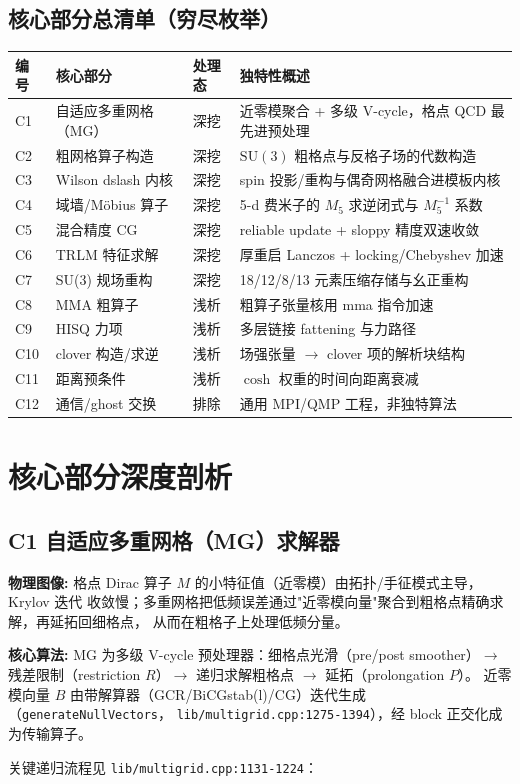 \documentclass[UTF8]{ctexart}
\begin{document}
\subsection{核心部分总清单（穷尽枚举）}
\begin{xltabular}{\textwidth}{lllX}
\toprule
\textcolor{algo}{编号} & 核心部分 & 处理态 & 独特性概述 \\
\midrule
\endhead
C1 & 自适应多重网格（MG） & 深挖 & 近零模聚合 + 多级 V-cycle，格点 QCD 最先进预处理 \\
C2 & 粗网格算子构造 & 深挖 & $\mathrm{SU}(3)$ 粗格点与反格子场的代数构造 \\
C3 & Wilson dslash 内核 & 深挖 & spin 投影/重构与偶奇网格融合进模板内核 \\
C4 & 域墙/Möbius 算子 & 深挖 & 5-d 费米子的 $M_5$ 求逆闭式与 $M_5^{-1}$ 系数 \\
C5 & 混合精度 CG & 深挖 & reliable update + sloppy 精度双速收敛 \\
C6 & TRLM 特征求解 & 深挖 & 厚重启 Lanczos + locking/Chebyshev 加速 \\
C7 & SU(3) 规场重构 & 深挖 & 18/12/8/13 元素压缩存储与幺正重构 \\
C8 & MMA 粗算子 & 浅析 & 粗算子张量核用 mma 指令加速 \\
C9 & HISQ 力项 & 浅析 & 多层链接 fattening 与力路径 \\
C10 & clover 构造/求逆 & 浅析 & 场强张量 $\to$ clover 项的解析块结构 \\
C11 & 距离预条件 & 浅析 & $\cosh$ 权重的时间向距离衰减 \\
C12 & 通信/ghost 交换 & 排除 & 通用 MPI/QMP 工程，非独特算法 \\
\bottomrule
\end{xltabular}

\section{核心部分深度剖析}

\subsection{C1 自适应多重网格（MG）求解器}
\begin{physbox}
\textbf{物理图像:} 格点 Dirac 算子 $M$ 的小特征值（近零模）由拓扑/手征模式主导，Krylov 迭代
收敛慢；多重网格把低频误差通过"近零模向量"聚合到粗格点精确求解，再延拓回细格点，
从而在粗格子上处理低频分量。
\end{physbox}
\begin{algobox}
\textbf{核心算法:} MG 为多级 V-cycle 预处理器：细格点光滑（pre/post smoother）$\to$
残差限制（restriction $R$）$\to$ 递归求解粗格点 $\to$ 延拓（prolongation $P$）。
 近零模向量 $B$ 由带解算器（GCR/BiCGstab(l)/CG）迭代生成（\texttt{generateNullVectors}，
\texttt{\nolinkurl{lib/multigrid.cpp:1275-1394}}），经 block 正交化成为传输算子。
\end{algobox}
关键递归流程见 \texttt{lib/multigrid.cpp:1131-1224}：

\end{document}
